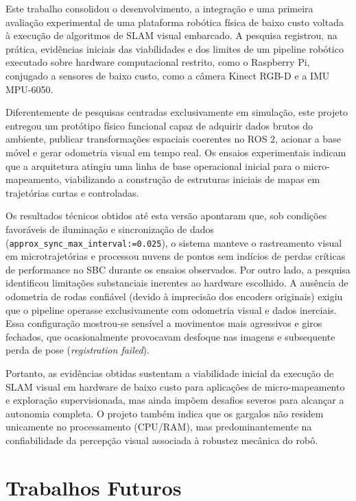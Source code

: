 Este trabalho consolidou o desenvolvimento, a integração e uma primeira avaliação experimental de uma plataforma robótica física de baixo custo voltada à execução de algoritmos de SLAM visual embarcado. A pesquisa registrou, na prática, evidências iniciais das viabilidades e dos limites de um pipeline robótico executado sobre hardware computacional restrito, como o Raspberry Pi, conjugado a sensores de baixo custo, como a câmera Kinect RGB-D e a IMU MPU-6050.

Diferentemente de pesquisas centradas exclusivamente em simulação, este projeto entregou um protótipo físico funcional capaz de adquirir dados brutos do ambiente, publicar transformações espaciais coerentes no ROS 2, acionar a base móvel e gerar odometria visual em tempo real. Os ensaios experimentais indicam que a arquitetura atingiu uma linha de base operacional inicial para o micro-mapeamento, viabilizando a construção de estruturas iniciais de mapas em trajetórias curtas e controladas.

Os resultados técnicos obtidos até esta versão apontaram que, sob condições favoráveis de iluminação e sincronização de dados (\texttt{approx\_sync\_max\_interval:=0.025}), o sistema manteve o rastreamento visual em microtrajetórias e processou nuvens de pontos sem indícios de perdas críticas de performance no SBC durante os ensaios observados. Por outro lado, a pesquisa identificou limitações substanciais inerentes ao hardware escolhido. A ausência de odometria de rodas confiável (devido à imprecisão dos encoders originais) exigiu que o pipeline operasse exclusivamente com odometria visual e dados inerciais. Essa configuração mostrou-se sensível a movimentos mais agressivos e giros fechados, que ocasionalmente provocavam desfoque nas imagens e subsequente perda de pose (\textit{registration failed}).

Portanto, as evidências obtidas sustentam a viabilidade inicial da execução de SLAM visual em hardware de baixo custo para aplicações de micro-mapeamento e exploração supervisionada, mas ainda impõem desafios severos para alcançar a autonomia completa. O projeto também indica que os gargalos não residem unicamente no processamento (CPU/RAM), mas predominantemente na confiabilidade da percepção visual associada à robustez mecânica do robô.

\section{Trabalhos Futuros}

